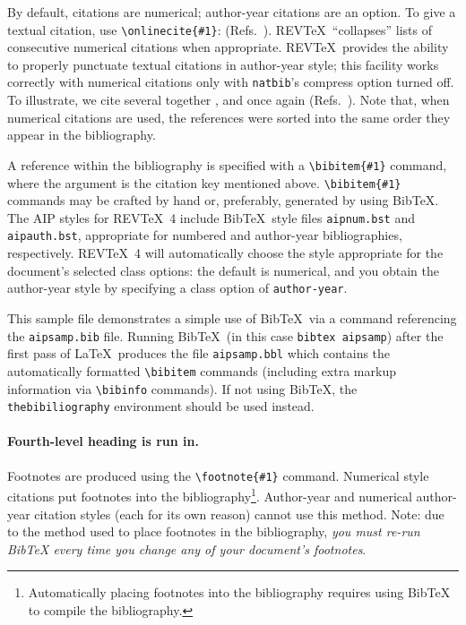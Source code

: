 \documentclass[%
 aip,
 jmp,%
 amsmath,amssymb,
 reprint,%
]{revtex4-1}
\begin{document}
By default, citations are numerical; \cite{feyn54} author-year citations are an option. 
To give a textual citation, use \verb+\onlinecite{#1}+: (Refs.~). 
REV\TeX\ ``collapses'' lists of consecutive numerical citations when appropriate. 
REV\TeX\ provides the ability to properly punctuate textual citations in author-year style;
this facility works correctly with numerical citations only with \texttt{natbib}'s compress option turned off. 
To illustrate, we cite several together \cite{feyn54,witten2001,epr,Berman1983}, 
and once again (Refs.~). 
Note that, when numerical citations are used, the references were sorted into the same order they appear in the bibliography. 

A reference within the bibliography is specified with a \verb+\bibitem{#1}+ command,
where the argument is the citation key mentioned above. 
\verb+\bibitem{#1}+ commands may be crafted by hand or, preferably,
generated by using Bib\TeX. 
The AIP styles for REV\TeX~4 include Bib\TeX\ style files
\verb+aipnum.bst+ and \verb+aipauth.bst+, appropriate for
numbered and author-year bibliographies,
respectively. 
REV\TeX~4 will automatically choose the style appropriate for 
the document's selected class options: the default is numerical, and
you obtain the author-year style by specifying a class option of \verb+author-year+.

This sample file demonstrates a simple use of Bib\TeX\ 
via a \verb++ command referencing the \verb+aipsamp.bib+ file.
Running Bib\TeX\ (in this case \texttt{bibtex
aipsamp}) after the first pass of \LaTeX\ produces the file
\verb+aipsamp.bbl+ which contains the automatically formatted
\verb+\bibitem+ commands (including extra markup information via
\verb+\bibinfo+ commands). If not using Bib\TeX, the
\verb+thebibiliography+ environment should be used instead.

\paragraph{Fourth-level heading is run in.}%
Footnotes are produced using the \verb+\footnote{#1}+ command. 
Numerical style citations put footnotes into the 
bibliography\footnote{Automatically placing footnotes into the bibliography requires using BibTeX to compile the bibliography.}.
Author-year and numerical author-year citation styles (each for its own reason) cannot use this method. 
Note: due to the method used to place footnotes in the bibliography, \emph{you
must re-run BibTeX every time you change any of your document's
footnotes}. 
\end{document}
